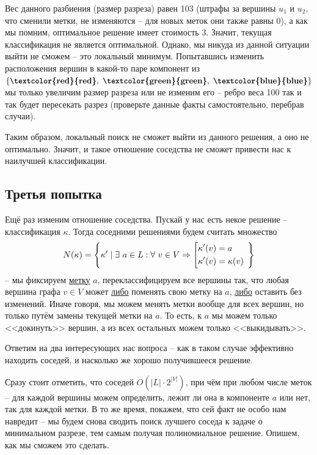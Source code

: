 \documentclass[a4paper,12pt]{article}
\begin{document}
Вес данного разбиения (размер разреза) равен 103 (штрафы за вершины $u_1$ и $u_2$, что сменили метки, не изменяются -- для новых меток они также равны 0), а как мы помним, оптимальное решение имеет стоимость 3. Значит, текущая классификация не является оптимальной. Однако, мы никуда из данной ситуации выйти не сможем -- это локальный минимум. Попытавшись изменить расположения вершин в какой-то паре компонент из $\{\textbf{\textcolor{red}{red}},\ \textbf{\textcolor{green}{green}},\ \textbf{\textcolor{blue}{blue}}\}$ мы только увеличим размер разреза или не изменим его -- ребро веса 100 так и так будет пересекать разрез (проверьте данные факты самостоятельно, перебрав случаи).

Таким образом, локальный поиск не сможет выйти из данного решения, а оно не оптимально. Значит, и такое отношение соседства не сможет привести нас к наилучшей классификации.

\subsection{Третья попытка}

Ещё раз изменим отношение соседства. Пускай у нас есть некое решение -- классификация $\kappa$. Тогда соседними решениями будем считать множество
\[N(\kappa) = \left\{\kappa'\mid \exists\ a \in L: \forall\ v \in V \Rightarrow \left[\begin{gathered} \kappa'(v) = a\hfill\\ \kappa'(v) = \kappa(v)\hfill\end{gathered}\right.\ \right\} \] -- мы фиксируем \underline{метку} $a$, переклассифицируем все вершины так, что любая вершина графа $v \in V$ может \underline{либо} поменять свою метку на $a$, \underline{либо} оставить без изменений. Иначе говоря, мы можем менять метки вообще для всех вершин, но только путём замены текущей метки на $a$. То есть, к $a$ мы можем только <<докинуть>> вершин, а из всех остальных можем только <<выкидывать>>.

Ответим на два интересующих нас вопроса -- как в таком случае эффективно находить соседей, и насколько же хорошо получившееся решение.

Сразу стоит отметить, что соседей $O(|L| \cdot 2^{|V|})$, при чём при любом числе меток -- для каждой вершины можем определить, лежит ли она в компоненте $a$ или нет, так для каждой метки. В то же время, покажем, что сей факт не особо нам навредит -- мы будем снова сводить поиск лучшего соседа к задаче о минимальном разрезе, тем самым получая полиномиальное решение. Опишем, как мы сможем это сделать.
\end{document}
